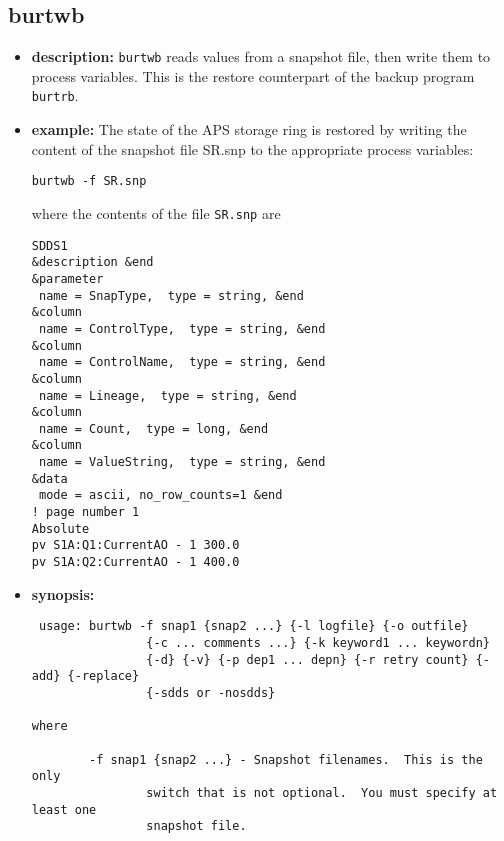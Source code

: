 %
%
\begin{latexonly}
\newpage
\end{latexonly}

%
%
\subsection{burtwb}
\label{burtwb}

\begin{itemize}
\item {\bf description:}
%
%
\verb+burtwb+ reads values from a snapshot file, then
write them to process variables. This is the restore
counterpart of the backup program \verb+burtrb+.
\item {\bf example:} 
%
% 
%
The state of the APS storage ring is restored by writing the 
content of the snapshot file SR.snp to the appropriate process variables:
\begin{verbatim}
burtwb -f SR.snp
\end{verbatim}
where the contents of the file \verb+SR.snp+ are
\begin{verbatim}
SDDS1
&description &end
&parameter
 name = SnapType,  type = string, &end
&column
 name = ControlType,  type = string, &end
&column
 name = ControlName,  type = string, &end
&column
 name = Lineage,  type = string, &end
&column
 name = Count,  type = long, &end
&column
 name = ValueString,  type = string, &end
&data
 mode = ascii, no_row_counts=1 &end
! page number 1
Absolute
pv S1A:Q1:CurrentAO - 1 300.0 
pv S1A:Q2:CurrentAO - 1 400.0 
\end{verbatim}
\item {\bf synopsis:} 
%
%
\begin{verbatim}
 usage: burtwb -f snap1 {snap2 ...} {-l logfile} {-o outfile}
                {-c ... comments ...} {-k keyword1 ... keywordn}
                {-d} {-v} {-p dep1 ... depn} {-r retry count} {-add} {-replace}
                {-sdds or -nosdds}
 
where
 
        -f snap1 {snap2 ...} - Snapshot filenames.  This is the only
                switch that is not optional.  You must specify at least one
                snapshot file.
 

\end{verbatim}
\end{itemize}
